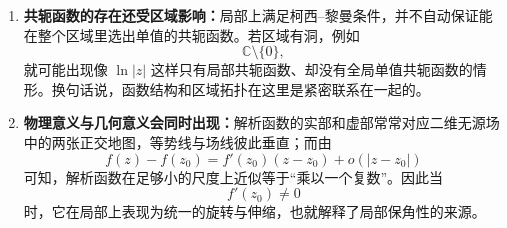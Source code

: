 \begin{zhongyao}[本章主要结论]
\begin{enumerate}
    \item \textbf{共轭函数的存在还受区域影响：}局部上满足柯西--黎曼条件，并不自动保证能在整个区域里选出单值的共轭函数。若区域有洞，例如
    \[
        \mathbb{C}\setminus\{0\},
    \]
    就可能出现像 $\ln|z|$ 这样只有局部共轭函数、却没有全局单值共轭函数的情形。换句话说，函数结构和区域拓扑在这里是紧密联系在一起的。

    \item \textbf{物理意义与几何意义会同时出现：}解析函数的实部和虚部常常对应二维无源场中的两张正交地图，等势线与场线彼此垂直；而由
    \[
        f(z)-f(z_0)=f'(z_0)(z-z_0)+o(|z-z_0|)
    \]
    可知，解析函数在足够小的尺度上近似等于``乘以一个复数''。因此当
    \[
        f'(z_0)\neq 0
    \]
    时，它在局部上表现为统一的旋转与伸缩，也就解释了局部保角性的来源。
\end{enumerate}
\end{zhongyao}

